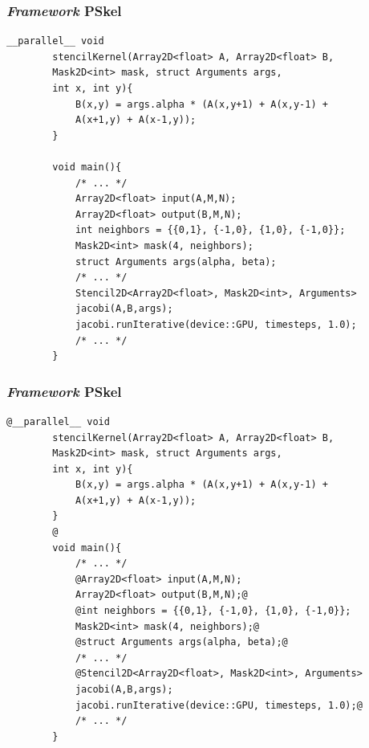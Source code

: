 \documentclass[xcolor={table}]{beamer}
\begin{document}
\begin{frame}[fragile]
    \frametitle{\textit{Framework} PSkel}
    \begin{lstlisting}[style=highlight, gobble=4]
        __parallel__ void
        stencilKernel(Array2D<float> A, Array2D<float> B,
        Mask2D<int> mask, struct Arguments args,
        int x, int y){
            B(x,y) = args.alpha * (A(x,y+1) + A(x,y-1) +
            A(x+1,y) + A(x-1,y));
        }

        void main(){
            /* ... */
            Array2D<float> input(A,M,N);
            Array2D<float> output(B,M,N);
            int neighbors = {{0,1}, {-1,0}, {1,0}, {-1,0}};
            Mask2D<int> mask(4, neighbors);
            struct Arguments args(alpha, beta);
            /* ... */
            Stencil2D<Array2D<float>, Mask2D<int>, Arguments>
            jacobi(A,B,args);
            jacobi.runIterative(device::GPU, timesteps, 1.0);
            /* ... */
        }
    \end{lstlisting}
\end{frame}

\begin{frame}[fragile]
    \frametitle{\textit{Framework} PSkel}
    \begin{lstlisting}[style=base, gobble=4]
        @__parallel__ void
        stencilKernel(Array2D<float> A, Array2D<float> B,
        Mask2D<int> mask, struct Arguments args,
        int x, int y){
            B(x,y) = args.alpha * (A(x,y+1) + A(x,y-1) +
            A(x+1,y) + A(x-1,y));
        }
        @
        void main(){
            /* ... */
            @Array2D<float> input(A,M,N);
            Array2D<float> output(B,M,N);@
            @int neighbors = {{0,1}, {-1,0}, {1,0}, {-1,0}};
            Mask2D<int> mask(4, neighbors);@
            @struct Arguments args(alpha, beta);@
            /* ... */
            @Stencil2D<Array2D<float>, Mask2D<int>, Arguments>
            jacobi(A,B,args);
            jacobi.runIterative(device::GPU, timesteps, 1.0);@
            /* ... */
        }
    \end{lstlisting}
\end{frame}
\end{document}
